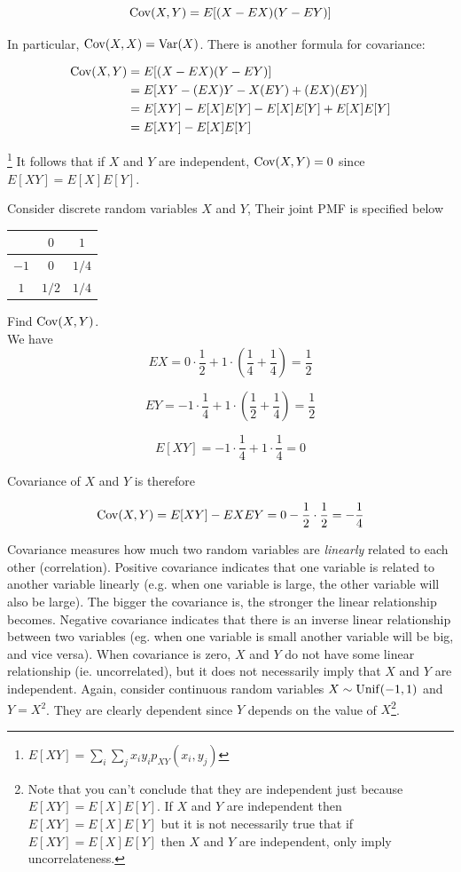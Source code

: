 \[ \operatorname{Cov}(X,Y)=E[(X-EX)(Y-EY)] \]

In particular, $\operatorname{Cov}(X,X)=\operatorname{Var}(X)$. There is another formula for covariance:

\begin{align*}
	\operatorname{Cov}(X,Y)&=E[(X-EX)(Y-EY)] \\
	&=E[XY-(EX)Y-X(EY)+(EX)(EY)] \\
	&=E[XY]-E[X]E[Y]-E[X]E[Y]+E[X]E[Y] \\
	&=E[XY]-E[X]E[Y]
\end{align*}

\footnote{$\displaystyle E[XY]=\sum_i \sum_j x_iy_ip_{XY}(x_i,y_j)$} It follows that if $X$ and $Y$ are independent, $\operatorname{Cov}(X,Y)=0$ since $E[XY]=E[X]E[Y]$.

\begin{texample}
	Consider discrete random variables $X$ and $Y$, Their joint PMF is specified below
	
	\begin{center}
		\begin{tabular}{|c|c|c|}
			\hline
			\diagbox{$Y$}{$X$} & $0$ & $1$ \\
			\hline
			$-1$ & $0$ & $1/4$ \\
			\hline
			$1$ & $1/2$ & $1/4$ \\
			\hline
		\end{tabular}
	\end{center}
	
	Find $\operatorname{Cov}(X,Y)$. \\
	
	We have
	\[EX=0 \cdot \frac12 + 1 \cdot \left(\frac14+\frac14\right)=\frac12\]
	
	\[EY=-1\cdot \frac14+1\cdot\left(\frac12+\frac14\right)=\frac12\]
	
	\[E[XY]=-1\cdot\frac14+1\cdot\frac14=0\]
	
	Covariance of $X$ and $Y$ is therefore
	
	\[\operatorname{Cov}(X,Y)=E[XY]-EXEY=0-\frac12\cdot\frac12=-\frac14\]
	
\end{texample}

Covariance measures how much two random variables are \textit{linearly} related to each other (correlation). Positive covariance indicates that one variable is related to another variable linearly (e.g. when one variable is large, the other variable will also be large). The bigger the covariance is, the stronger the linear relationship becomes. Negative covariance indicates that there is an inverse linear relationship between two variables (eg. when one variable is small another variable will be big, and vice versa). When covariance is zero, $X$ and $Y$ do not have some linear relationship (ie. uncorrelated), but it does not necessarily imply that $X$ and $Y$ are independent. Again, consider continuous random variables $X \sim \operatorname{Unif}(-1,1)$ and $Y=X^2$. They are clearly dependent since $Y$ depends on the value of $X$\footnote{Note that you can't conclude that they are independent just because $E[XY]=E[X]E[Y]$. If $X$ and $Y$ are independent then $E[XY]=E[X]E[Y]$ but it is not necessarily true that if $E[XY]=E[X]E[Y]$ then $X$ and $Y$ are independent, only imply uncorrelateness.}.

